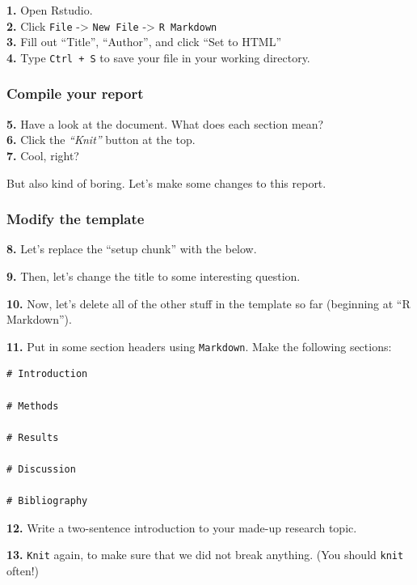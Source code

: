 \documentclass[]{book}
\begin{document}
\textbf{1.} Open Rstudio.\\
\textbf{2.} Click \texttt{File} -\textgreater{} \texttt{New\ File} -\textgreater{} \texttt{R\ Markdown}\\
\textbf{3.} Fill out ``Title'', ``Author'', and click ``Set to HTML''\\
\textbf{4.} Type \texttt{Ctrl\ +\ S} to save your file in your working directory.

\hypertarget{compile-your-report}{%
\subsubsection*{Compile your report}\label{compile-your-report}}

\textbf{5.} Have a look at the document. What does each section mean?\\
\textbf{6.} Click the \emph{``Knit''} button at the top.\\
\textbf{7.} Cool, right?

But also kind of boring. Let's make some changes to this report.

\hypertarget{modify-the-template}{%
\subsubsection*{Modify the template}\label{modify-the-template}}

\textbf{8.} Let's replace the ``setup chunk'' with the below.

\textbf{9.} Then, let's change the title to some interesting question.

\textbf{10.} Now, let's delete all of the other stuff in the template so far (beginning at ``R Markdown'').

\textbf{11.} Put in some section headers using \texttt{Markdown}. Make the following sections:

\begin{verbatim}
# Introduction

# Methods

# Results

# Discussion

# Bibliography
\end{verbatim}

\textbf{12.} Write a two-sentence introduction to your made-up research topic.

\textbf{13.} \texttt{Knit} again, to make sure that we did not break anything. (You should \texttt{knit} often!)
\end{document}
